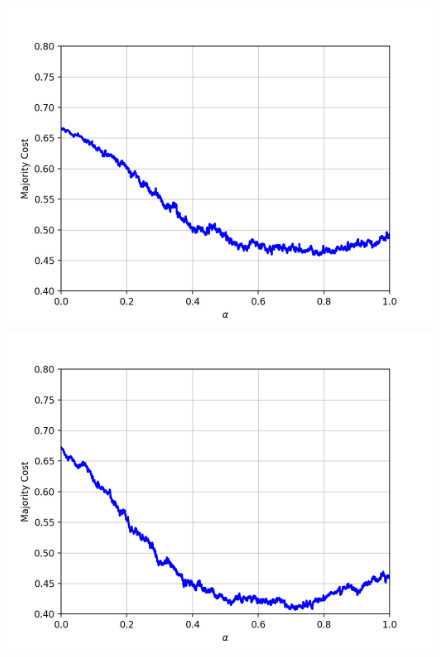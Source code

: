 \begin{figure}[H]
\centering
\begin{minipage}{.3\textwidth}
  \centering
  \includegraphics[width=\linewidth]{plots/mnist-ac-0}
\end{minipage}
\begin{minipage}{.3\textwidth}
  \centering
  \includegraphics[width=\linewidth]{plots/mnist-ac-1}
\end{minipage}
\begin{minipage}{.3\textwidth}
  \centering

\end{minipage}
\end{figure}
